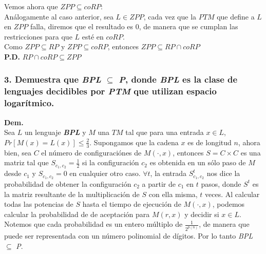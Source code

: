 \documentclass[12pt]{article}
\begin{document}
Vemos ahora que $ZPP \subseteq coRP$: \\
Análogamente al caso anterior, sea $L \in ZPP$, cada vez que la $PTM$ que define a $L$ en $ZPP$ falla, diremos que el resultado es 0, de manera que se cumplan las restricciones para que $L$ esté en $coRP$. \\

Como $ZPP \subseteq RP$ y $ZPP \subseteq coRP$, entonces $ZPP \subseteq RP \cap coRP$ \\

\fbox{\textbf{$\supseteq$}} \textbf{P.D.} $RP \cap coRP \subseteq ZPP$ \\



\subsubsection*{3. Demuestra que \textit{BPL} $\subseteq$ \textit{P}, donde \textit{BPL} es la clase de lenguajes decidibles por \textit{PTM} que utilizan espacio logarítmico.}
\textbf{Dem.}\\
Sea $L$ un lenguaje \textbf{\textit{BPL}} y $M$ una $TM$ tal que para una entrada $x \in L$, $Pr[M(x) = L(x)] \leq \frac{2}{3}$. Supongamos que la cadena $x$ es de longitud $n$, ahora bien, sea $C$ el número de configuraciónes de $M(\cdot,x)$, entonces $S = C \times C$ es una matriz tal que $S_{{c_1},{c_2}} = \frac{1}{2}$ si la configuración $c_2$ es obtenida en un sólo paso de $M$ desde $c_1$ y  $S_{{c_1},{c_2}} = 0$ en cualquier otro caso. $\forall t$, la entrada $S^t_{{c_1},{c_2}}$ nos dice la probabilidad de obtener
la configuración $c_2$ a partir de $c_1$ en $t$ pasos, donde $S^t$ es la matriz resultante de la multiplicación de $S$ con ella misma, $t$ veces. Al calcular todas las potencias de $S$ hasta el tiempo de ejecución de $M(\cdot,x)$, podemos calcular la probabilidad de de aceptación para $M(r,x)$ y decidir si $x \in L$. Notemos que cada probabilidad es un entero múltiplo de $\frac{1}{2^{p(n)}}$, de manera que puede ser representada con un número polinomial de dígitos. Por lo tanto \textit{BPL} $\subseteq$ \textit{P}.
\end{document}
